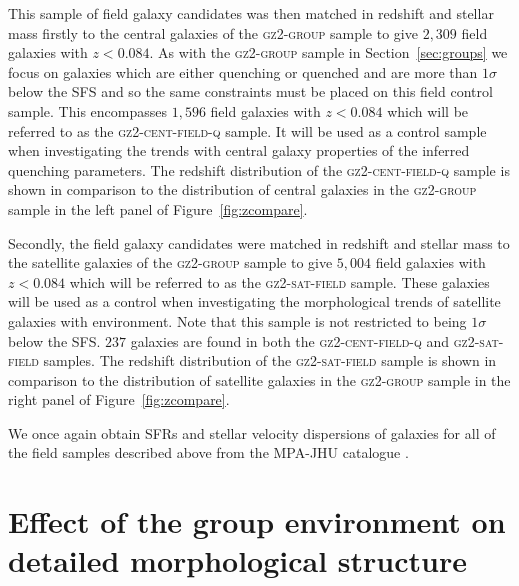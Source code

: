 \documentclass[useAMS,usenatbib]{mn2e}
\begin{document}
This sample of field galaxy candidates was then matched in redshift and stellar mass firstly to the central galaxies of the \textsc{gz2-group} sample to give $2,309$ field galaxies with $z < 0.084$. As with the \textsc{gz2-group} sample in Section~\ref{sec:groups} we focus on galaxies which are either quenching or quenched and are more than $1\sigma$ below the SFS and so the same constraints must be placed on this field control sample. This encompasses $1,596$ field galaxies with $z < 0.084$ which will be referred to as the \textsc{gz2-cent-field-q} sample. It will be used as a control sample when investigating the trends with central galaxy properties of the inferred quenching parameters. The redshift distribution of the \textsc{gz2-cent-field-q} sample is shown in comparison to the distribution of central galaxies in the \textsc{gz2-group} sample in the left panel of Figure~\ref{fig:zcompare}. 

Secondly, the field galaxy candidates were matched in redshift and stellar mass to the satellite galaxies of the \textsc{gz2-group} sample to give $5, 004$ field galaxies with $z < 0.084$ which will be referred to as the \textsc{gz2-sat-field} sample. These galaxies will be used as a control when investigating the morphological trends of satellite galaxies with environment. Note that this sample is not restricted to being $1\sigma$ below the SFS. $237$ galaxies are found in both the \textsc{gz2-cent-field-q} and \textsc{gz2-sat-field} samples. The redshift distribution of the \textsc{gz2-sat-field} sample is shown in comparison to the distribution of satellite galaxies in the \textsc{gz2-group} sample in the right panel of Figure~\ref{fig:zcompare}.

We once again obtain SFRs and stellar velocity dispersions of galaxies for all of the field samples described above from the MPA-JHU catalogue \citep{kauffmann03, brinchmann04}.


\section{Effect of the group environment on detailed morphological structure}\label{sec:morphfrac}
\end{document}
